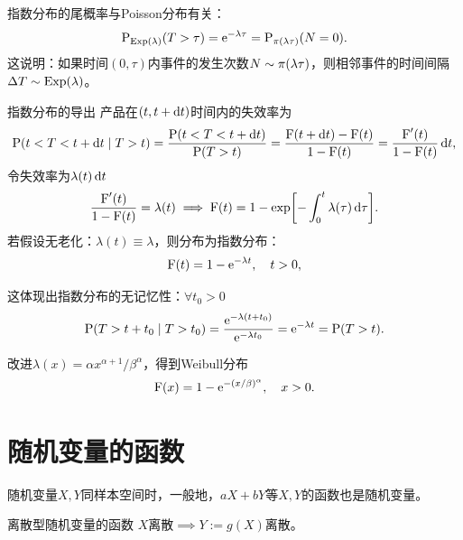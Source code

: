 \begin{corollary}
	指数分布的尾概率与Poisson分布有关：
	\begin{equation}\label{eq:ps-poisson-waiting-time}
		\operatorname{P}_{\operatorname{Exp}(\lambda)}(T > \tau) = \mathop{}\!\mathrm{e}^{-\lambda\tau} = \operatorname{P}_{\operatorname{\pi}(\lambda\tau)}(N = 0).
	\end{equation}
	这说明：如果时间$(0,\tau)$内事件的发生次数$N \sim \operatorname{\pi}(\lambda\tau)$，则相邻事件的时间间隔$\Delta T \sim \operatorname{Exp}(\lambda)$。
\end{corollary}

\begin{example}{指数分布的导出}{}
	产品在$(t,t + \mathop{}\!\mathrm{d} t)$时间内的失效率为
	\[
		\operatorname{P}(t < T < t + \mathop{}\!\mathrm{d} t \mid T > t) = \frac{\operatorname{P}(t < T < t + \mathop{}\!\mathrm{d} t)}{\operatorname{P}(T > t)} = \frac{\operatorname{F}(t + \mathop{}\!\mathrm{d} t) - \operatorname{F}(t)}{1 - \operatorname{F}(t)} = \frac{\operatorname{F}'(t)}{1 - \operatorname{F}(t)}\mathop{}\!\mathrm{d} t,
	\]
	令失效率为$\lambda(t)\mathop{}\!\mathrm{d} t$
	\begin{equation}\label{eq:ps-hazard-survival}
		\frac{\operatorname{F}'(t)}{1 - \operatorname{F}(t)} = \lambda(t) \implies \operatorname{F}(t) = 1 - \exp\biggl[-\int_0^t\lambda(\tau)\mathop{}\!\mathrm{d}\tau\biggr].
	\end{equation}
	若假设无老化：$\lambda(t) \equiv \lambda$，则分布为指数分布：
	\begin{equation}
		\operatorname{F}(t) = 1 - \mathop{}\!\mathrm{e}^{-\lambda t},\quad t > 0,
	\end{equation}

	这体现出指数分布的无记忆性：$\forall t_0 > 0$
	\begin{equation}\label{eq:ps-exponential-memoryless}
		\operatorname{P}(T > t + t_0 \mid T > t_0) = \frac{\mathop{}\!\mathrm{e}^{-\lambda(t+t_0)}}{\mathop{}\!\mathrm{e}^{-\lambda t_0}} = \mathop{}\!\mathrm{e}^{-\lambda t} = \operatorname{P}(T > t).
	\end{equation}

	\tcblower
	
	改进$\lambda(x) = \alpha x^{\alpha+1}/\beta^\alpha$，得到Weibull分布
	\begin{equation}
		\label{eqn:Weibull CDF}
		\operatorname{F}(x) = 1 - \mathop{}\!\mathrm{e}^{-(x/\beta)^\alpha},\quad x > 0.
	\end{equation}
\end{example}

\section{随机变量的函数}

随机变量$X,Y$同样本空间时，一般地，$aX + bY$等$X,Y$的函数也是随机变量。

\begin{theorem}
	{离散型随机变量的函数}{}
	$X$离散$\implies Y := g(X)$离散。
\end{theorem}

